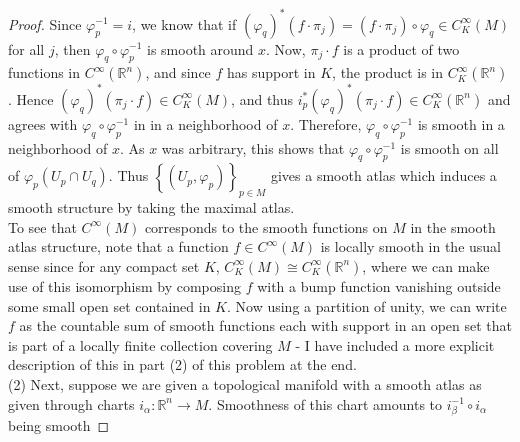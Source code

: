 \documentclass[reqno]{amsart}
\theoremstyle{definition}
\theoremstyle{remark}
\begin{document}
\begin{proof}
        
        Since $\varphi_p^{-1} =
        i$, we know that if
        $\left( \varphi_q \right)^* \left( f\cdot 
        \pi_j \right) 
        =  (f \cdot \pi_j) \circ \varphi_q \in C_K^{\infty}(M)$
        for all $j$, then
        $\varphi_q \circ \varphi_p^{-1}$ is smooth around
        $x$.
        Now,
        $\pi_j \cdot f$ is a product of two
        functions in
        $C^{\infty}\left( \mathbb{R}^{n} \right) $, and
        since $f$ has support in $K$, the product is
        in $C_{K}^{\infty}\left( \mathbb{R}^{n} \right) $.
        Hence
        $\left( \varphi_q \right)^* 
        \left( \pi_j \cdot  f \right) 
        \in C_{K}^{\infty}(M)$, and thus
        $i_p^{*} \left( \varphi_q \right)^{*}
        \left( \pi_j \cdot f \right) \in C_{K}^{\infty}\left(
        \mathbb{R}^{n} \right) $ and
        agrees with $\varphi_q \circ \varphi_p^{-1}$ in in
        a neighborhood of $x$. Therefore,
        $\varphi_q \circ \varphi_p^{-1}$ is smooth in a
        neighborhood of $x$.
        As $x$ was arbitrary, this shows
        that $\varphi_q \circ \varphi_p^{-1}$ is smooth
        on all of
       $\varphi_p \left( U_p \cap U_q \right) $.
        Thus
        $\left\{ \left( U_p, \varphi_p \right)  \right\}_{
        p \in M}$ gives a smooth atlas which induces
        a smooth structure by taking the maximal atlas.\\
        To see that $C^{\infty}(M)$ corresponds to the
        smooth functions on $M$ in the smooth atlas
        structure, note that a function
        $f \in C^{\infty}(M)$ is locally
        smooth in the usual sense since
        for any compact set  $K$, 
        $C_K^{\infty}(M) \cong C_{K}^{\infty}\left( \mathbb{R}^{n}
        \right) $, where we can make use of this isomorphism by
        composing $f$ with a bump function vanishing
        outside some small
        open set contained in $K$. Now using a partition
        of unity, we can write $f$ as the countable sum
        of smooth functions each with support in
        an open set that is part of a locally finite
        collection covering $M$ - I have
        included a more explicit description
        of this in part (2) of this problem at the end.\\
        \linebreak
        (2) Next, suppose
        we are given a topological manifold
        with a smooth atlas as given through charts
        $i_{\alpha} 
        \colon \mathbb{R}^{n} \to 
        M$. Smoothness of this chart amounts to
        $i_{\beta}^{-1} \circ i_{\alpha}$ being smooth

\end{proof}
\end{document}
